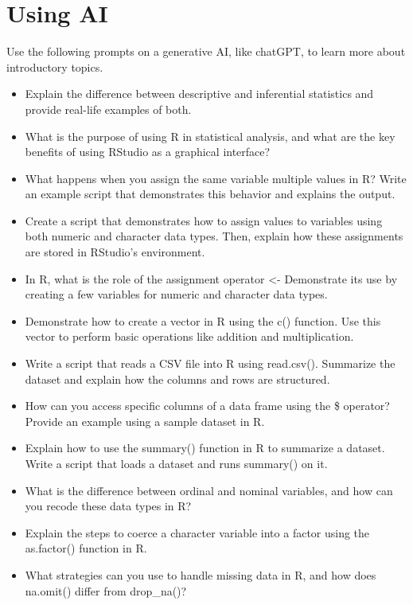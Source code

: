 \documentclass[
  letterpaper,
  DIV=11,
  numbers=noendperiod]{scrreprt}
\begin{document}

\chapter{Using AI}\label{using-ai}

Use the following prompts on a generative AI, like chatGPT, to learn
more about introductory topics.

\begin{itemize}
\item
  Explain the difference between descriptive and inferential statistics
  and provide real-life examples of both.
\item
  What is the purpose of using R in statistical analysis, and what are
  the key benefits of using RStudio as a graphical interface?
\item
  What happens when you assign the same variable multiple values in R?
  Write an example script that demonstrates this behavior and explains
  the output.
\item
  Create a script that demonstrates how to assign values to variables
  using both numeric and character data types. Then, explain how these
  assignments are stored in RStudio's environment.
\item
  In R, what is the role of the assignment operator \textless-
  Demonstrate its use by creating a few variables for numeric and
  character data types.
\item
  Demonstrate how to create a vector in R using the c() function. Use
  this vector to perform basic operations like addition and
  multiplication.
\item
  Write a script that reads a CSV file into R using read.csv().
  Summarize the dataset and explain how the columns and rows are
  structured.
\item
  How can you access specific columns of a data frame using the \$
  operator? Provide an example using a sample dataset in R.
\item
  Explain how to use the summary() function in R to summarize a dataset.
  Write a script that loads a dataset and runs summary() on it.
\item
  What is the difference between ordinal and nominal variables, and how
  can you recode these data types in R?
\item
  Explain the steps to coerce a character variable into a factor using
  the as.factor() function in R.
\item
  What strategies can you use to handle missing data in R, and how does
  na.omit() differ from drop\_na()?
\end{itemize}
\end{document}
